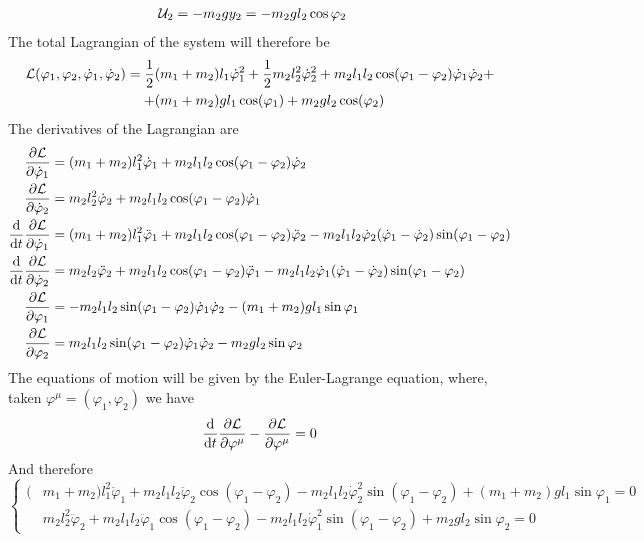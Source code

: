 \documentclass[../admech.tex]{subfiles}
\begin{document}
\begin{exe}
\begin{equation}
\begin{aligned}
			\mathcal{U}_2&=-m_2gy_2=-m_2gl_2\cos\varphi_2
		\end{aligned}
		\label{eq:poten2part}
	\end{equation}
	The total Lagrangian of the system will therefore be
	\begin{equation}
		\begin{aligned}
			\mathcal{L}(\varphi_1,\varphi_2,\dot{\varphi}_1,\dot{\varphi}_2)=\frac{1}{2}&(m_1+m_2)l_1\dot{\varphi}_1^2+\frac{1}{2}m_2l_2^2\dot{\varphi}_2^2+m_2l_1l_2\cos(\varphi_1-\varphi_2)\dot{\varphi}_1\dot{\varphi}_2+\\
			+&(m_1+m_2)gl_1\cos(\varphi_1)+m_2gl_2\cos(\varphi_2)
		\end{aligned}
		\label{eq:lagdp}
	\end{equation}
	The derivatives of the Lagrangian are
	\begin{equation}
		\begin{aligned}
			\pdv{\mathcal{L}}{\dot{\varphi}_1}&=(m_1+m_2)l_1^2\dot{\varphi}_1+m_2l_1l_2\cos(\varphi_1-\varphi_2)\dot{\varphi}_2\\
			\pdv{\mathcal{L}}{\dot{\varphi}_2}&=m_2l_2^2\dot{\varphi}_2+m_2l_1l_2\cos(\varphi_1-\varphi_2)\dot{\varphi}_1\\
			\dv{t}\pdv{\mathcal{L}}{\dot{\varphi}_1}&=(m_1+m_2)l_1^2\ddot{\varphi}_1+m_2l_1l_2\cos(\varphi_1-\varphi_2)\ddot{\varphi}_2-m_2l_1l_2\dot{\varphi}_2(\dot{\varphi}_1-\dot{\varphi}_2)\sin(\varphi_1-\varphi_2)\\
			\dv{t}\pdv{\mathcal{L}}{\dot{\varphi}_2}&=m_2l_2\ddot{\varphi}_2+m_2l_1l_2\cos(\varphi_1-\varphi_2)\ddot{\varphi}_1-m_2l_1l_2\dot{\varphi}_1(\dot{\varphi}_1-\dot{\varphi}_2)\sin(\varphi_1-\varphi_2)\\
			\pdv{\mathcal{L}}{\varphi_1}&=-m_2l_1l_2\sin(\varphi_1-\varphi_2)\dot{\varphi}_1\dot{\varphi}_2-(m_1+m_2)gl_1\sin\varphi_1\\
			\pdv{\mathcal{L}}{\varphi_2}&=m_2l_1l_2\sin(\varphi_1-\varphi_2)\dot{\varphi}_1\dot{\varphi}_2-m_2gl_2\sin\varphi_2\\
		\end{aligned}
		\label{eq:lagderdp}
	\end{equation}
	The equations of motion will be given by the Euler-Lagrange equation, where, taken $\varphi^\mu=(\varphi_1,\varphi_2)$ we have
	\begin{equation*}
		\dv{t}\pdv{\mathcal{L}}{\varphi^\mu}-\pdv{\mathcal{L}}{\varphi^\mu}=0
	\end{equation*}
	And therefore
	\begin{equation}
		\left\{ \begin{aligned}
				(&m_1+m_2)l_1^2\ddot{\varphi}_1+m_2l_1l_2\ddot{\varphi}_2\cos(\varphi_1-\varphi_2)-m_2l_1l_2\dot{\varphi}_2^2\sin(\varphi_1-\varphi_2)+(m_1+m_2)gl_1\sin\varphi_1=0\\
				&m_2l_2^2\ddot{\varphi}_2+m_2l_1l_2\ddot{\varphi}_1\cos(\varphi_1-\varphi_2)-m_2l_1l_2\dot{\varphi}_1^2\sin(\varphi_1-\varphi_2)+m_2gl_2\sin\varphi_2=0
		\end{aligned}\right.
		\label{eq:eqm}
	\end{equation}
\end{exe}
\end{document}
